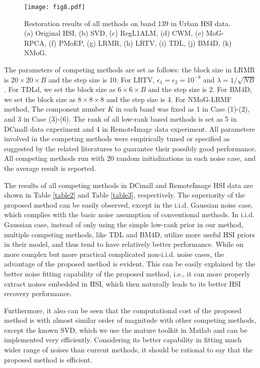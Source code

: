 \documentclass[journal]{IEEEtran}
\begin{document}
\begin{figure*}
	\centering
	\texttt{[image: fig8.pdf]}\vspace{-3mm}
	\caption{Restoration results of all methods on band 139 in Urban HSI data. (a) Original HSI, (b) SVD, (c) RegL1ALM, (d) CWM, (e) MoG-RPCA, (f) PMoEP, (g) LRMR, (h) LRTV, (i) TDL, (j) BM4D, (k) NMoG.  \label{urban139} }
\end{figure*}

The parameters of competing methods are set as follows:  the block size in LRMR is $ 20 \times 20 \times B $ and the step size is 10. For LRTV, $\epsilon_1=\epsilon_2=10^{-8} $ and $ \lambda=1/\sqrt{NB} $. For TDLd, we set the block size as $ 6 \times 6 \times B $ and the step size is 2. For BM4D, we set the block size as $ 8 \times 8 \times 8 $ and the step size is 4.  For NMoG-LRMF method, The component number $ K $ in each band was fixed as 1 in Case (1)-(2), and 3 in Case (3)-(6). %
The rank of all low-rank based methods is set as 5 in DCmall data experiment and 4 in RemoteImage data experiment.
All parameters involved in the competing methods were empirically tuned or specified as suggested by the related literatures to guarantee their possibly good performance.
All competing methods run with 20 random initializations in each noise case, and the average result is reported.

The results of all competing methods in DCmall and RemoteImage HSI data are shown in Table \ref{table2} and Table \ref{table3}, respectively.	
The superiority of the proposed method can be easily observed, except in the i.i.d. Gaussian noise case, which complies with the basic noise assumption of conventional methods. In i.i.d. Gaussian case, instead of only using the simple low-rank prior in our method, multiple competing methods, like TDL and BM4D, utilize more useful HSI priors in their model, and thus tend to have relatively better performance. While on more complex but more practical complicated non-i.i.d. noise cases, the advantage of the proposed method is evident. This can be easily explained by the better noise fitting capability of the proposed method, i.e., it can more properly extract noises embedded in HSI, which then naturally leads to its better HSI recovery performance.

Furthermore, it also can be seen that the computational cost of the proposed method is with almost similar order of magnitude with other competing methods, except the known SVD, which we use the mature toolkit in Matlab and can be implemented very efficiently. Considering its better capability in fitting much wider range of noises than current methods, it should be rational to say that the proposed method is efficient.
\end{document}
